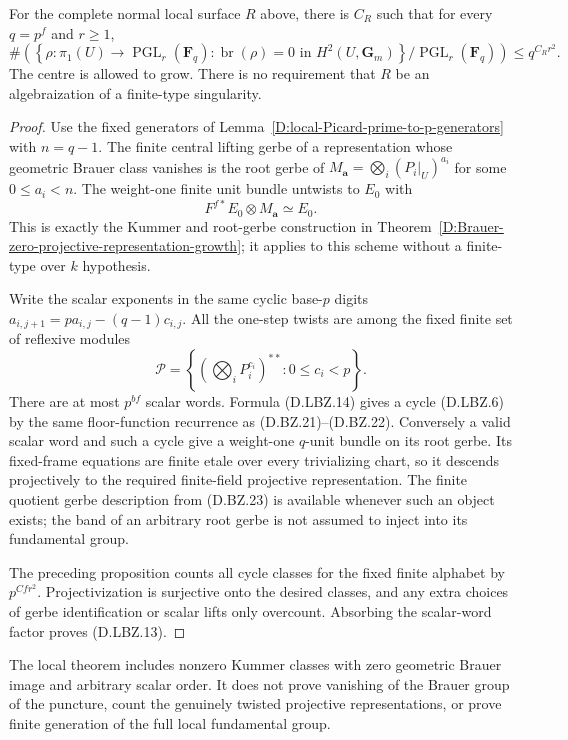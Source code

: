 \begin{theorem}
\label{D:local-Brauer-zero-projective-growth}
For the complete normal local surface $R$ above, there is
$C_R$ such that for every $q=p^f$ and $r\ge1$,
\[
 \#\left(
  \left\{\rho:\pi_1(U)\to\operatorname{PGL}_r(\mathbf F_q):
              \operatorname{br}(\rho)=0
                    \text{ in }H^2(U,\mathbf G_m)\right\}
       /\operatorname{PGL}_r(\mathbf F_q)\right)
                     \le q^{C_Rr^2}.                   \tag{D.LBZ.13}
\]
The centre is allowed to grow.  There is no requirement
that $R$ be an algebraization of a finite-type singularity.
\end{theorem}

\begin{proof}
Use the fixed generators of
Lemma~\ref{D:local-Picard-prime-to-p-generators}
with $n=q-1$.  The finite central lifting gerbe of
a representation whose geometric Brauer class
vanishes is the root gerbe of
$M_{\mathbf a}=\bigotimes_i(P_i|_U)^{a_i}$
for some $0\le a_i<n$.
The weight-one finite unit bundle untwists to
$E_0$ with
\[
                 F^{f*}E_0\otimes M_{\mathbf a}
                                     \simeq E_0.
                                                        \tag{D.LBZ.14}
\]
This is exactly the Kummer and root-gerbe
construction in
Theorem~\ref{D:Brauer-zero-projective-representation-growth};
it applies to this scheme without a finite-type
over $k$ hypothesis.

Write the scalar exponents in the same cyclic
base-$p$ digits
$a_{i,j+1}=p a_{i,j}-(q-1)c_{i,j}$.
All the one-step twists are among the fixed
finite set of reflexive modules
\[
       \mathscr P=
       \left\{\left(\bigotimes_iP_i^{c_i}\right)^{**}:
                                0\le c_i<p\right\}.
                                                        \tag{D.LBZ.15}
\]
There are at most $p^{bf}$ scalar words.
Formula (D.LBZ.14) gives a cycle (D.LBZ.6)
by the same floor-function recurrence as
(D.BZ.21)--(D.BZ.22).  Conversely a valid
scalar word and such a cycle give a
weight-one $q$-unit bundle on its root
gerbe.  Its fixed-frame equations are
finite etale over every trivializing
chart, so it descends projectively to
the required finite-field projective
representation.  The finite quotient
gerbe description from (D.BZ.23) is
available whenever such an object exists;
the band of an arbitrary root gerbe
is not assumed to inject into its
fundamental group.

The preceding proposition counts all
cycle classes for the fixed finite
alphabet by $p^{Cfr^2}$.  Projectivization
is surjective onto the desired classes,
and any extra choices of gerbe
identification or scalar lifts only
overcount.  Absorbing the scalar-word
factor proves (D.LBZ.13).
\end{proof}

\begin{remark}
The local theorem includes nonzero Kummer classes with
zero geometric Brauer image and arbitrary scalar order.
It does not prove vanishing of the Brauer group of the
puncture, count the genuinely twisted projective
representations, or prove finite generation of the
full local fundamental group.
\end{remark}
